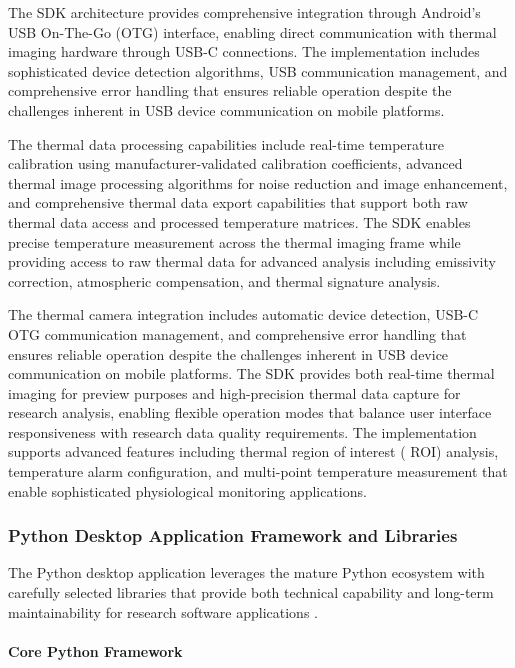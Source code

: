 \documentclass[12pt,a4paper]{report}
\begin{document}
The SDK architecture provides comprehensive integration through Android's USB On-The-Go (OTG) interface, enabling direct
communication with thermal imaging hardware through USB-C connections. The implementation includes sophisticated device
detection algorithms, USB communication management, and comprehensive error handling that ensures reliable operation
despite the challenges inherent in USB device communication on mobile platforms.

The thermal data processing capabilities include real-time temperature calibration using manufacturer-validated
calibration coefficients, advanced thermal image processing algorithms for noise reduction and image enhancement, and
comprehensive thermal data export capabilities that support both raw thermal data access and processed temperature
matrices. The SDK enables precise temperature measurement across the thermal imaging frame while providing access to raw
thermal data for advanced analysis including emissivity correction, atmospheric compensation, and thermal signature
analysis.

The thermal camera integration includes automatic device detection, USB-C OTG communication management, and
comprehensive error handling that ensures reliable operation despite the challenges inherent in USB device communication
on mobile platforms. The SDK provides both real-time thermal imaging for preview purposes and high-precision thermal
data capture for research analysis, enabling flexible operation modes that balance user interface responsiveness with
research data quality requirements. The implementation supports advanced features including thermal region of interest (
ROI) analysis, temperature alarm configuration, and multi-point temperature measurement that enable sophisticated
physiological monitoring applications.

\subsubsection{Python Desktop Application Framework and Libraries}

The Python desktop application leverages the mature Python ecosystem with carefully selected libraries that provide both
technical capability and long-term maintainability for research software applications .

\paragraph{Core Python Framework}
\end{document}
